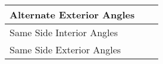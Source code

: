 \documentclass[12pt,letterpaper]{article}
\begin{document}
\begin{enumerate}
\begin{tabularx}{0.95\textwidth} {
                  | >{\raggedright\arraybackslash}X
                  | >{\centering\arraybackslash}X
                  | >{\raggedleft\arraybackslash}X |}
              \hline
              \vspace{5mm}Alternate Exterior Angles\vspace{5mm}              &                    &                                            \\
              \hline
              \vspace{5mm}Same Side Interior Angles\vspace{5mm}              &                    &                                            \\
              \hline
              \vspace{5mm}Same Side Exterior Angles\vspace{5mm}              &                    &                                            \\
              \hline
          \end{tabularx}
\end{enumerate}
\end{document}
